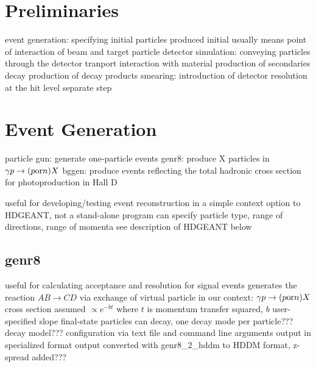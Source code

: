 \section{Preliminaries}


event generation: specifying initial particles produced
  initial usually means point of interaction of beam and target particle
detector simulation: conveying particles through the detector
  tranport
  interaction with material
    production of secondaries
  decay
    production of decay products
smearing: introduction of detector resolution at the hit level
  separate step 

\section{Event Generation}


particle gun: generate one-particle events
genr8: produce X particles in $\gamma p \rightarrow (p {\rm or} n) X$
bggen: produce events reflecting the total hadronic cross section for photoproduction in Hall D


\I useful for developing/testing event reconstruction in a simple context
\I option to HDGEANT, not a stand-alone program
\I can specify particle type, range of directions, range of momenta
\I see description of HDGEANT below

\subsection{genr8}


\I useful for calculating acceptance and resolution for signal events
\I generates the reaction $AB \to CD$ via exchange of virtual particle
  \I in our context: $\gamma p \rightarrow (p {\rm or} n) X$
  \I cross section assumed $\propto e^{-bt}$ where $t$ is momentum transfer squared, $b$ user-specified slope
  \I final-state particles can decay, one decay mode per particle???
  \I decay model???
\I configuration via text file and command line arguments
\I output in specialized format
\I output converted with genr8\_2\_hddm to HDDM format, z-spread added???


